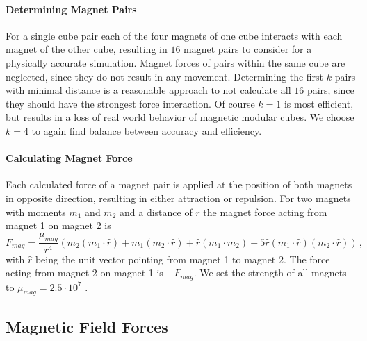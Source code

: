 \paragraph{Determining Magnet Pairs}

For a single cube pair each of the four magnets of one cube interacts with each magnet of the other cube, resulting in $16$ magnet pairs to consider for a physically accurate simulation.
Magnet forces of pairs within the same cube are neglected, since they do not result in any movement.
Determining the first $k$ pairs with minimal distance is a reasonable approach to not calculate all $16$ pairs, since they should have the strongest force interaction.
Of course $k=1$ is most efficient, but results in a loss of real world behavior of magnetic modular cubes.
We choose $k=4$ to again find balance between accuracy and efficiency.

\paragraph{Calculating Magnet Force}

Each calculated force of a magnet pair is applied at the position of both magnets in opposite direction, resulting in either attraction or repulsion.
For two magnets with moments $m_1$ and $m_2$ and a distance of $r$ the magnet force acting from magnet 1 on magnet 2 is
\begin{equation}
F_\textit{mag} = \frac{\mu_\textit{mag}}{r^4} \left(m_2(m_1 \cdotp \hat{r}) + m_1(m_2 \cdotp \hat{r}) + \hat{r}(m_1 \cdotp m_2) - 5\hat{r}(m_1 \cdotp \hat{r})(m_2 \cdotp \hat{r}) \right) \, ,
\end{equation}
with $\hat{r}$ being the unit vector pointing from magnet 1 to magnet 2.
The force acting from magnet 2 on magnet 1 is $-F_\textit{mag}$.
We set the strength of all magnets to $\mu_{mag} = 2.5 \cdot 10^7$ \cite{levitt2013}. 


\subsection{Magnetic Field Forces}
\label{sec:force_field}

